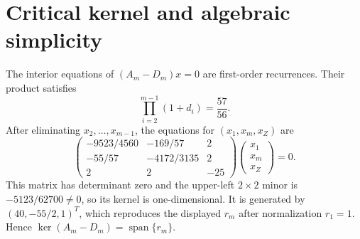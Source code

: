 \section*{Critical kernel and algebraic simplicity}
The interior equations of $(A_m-D_m)x=0$ are first-order recurrences.  Their
product satisfies
\[
\prod_{i=2}^{m-1}(1+d_i)=\frac{57}{56}.
\]
After eliminating $x_2,\ldots,x_{m-1}$, the equations for
$(x_1,x_m,x_Z)$ are
\[
\begin{pmatrix}
-9523/4560&-169/57&2\\
-55/57&-4172/3135&2\\
2&2&-25
\end{pmatrix}
\begin{pmatrix}x_1\\x_m\\x_Z\end{pmatrix}=0.
\]
This matrix has determinant zero and the upper-left $2\times2$ minor is
$-5123/62700\neq0$, so its kernel is one-dimensional.  It is generated by
$(40,-55/2,1)^T$, which reproduces the displayed $r_m$ after normalization
$r_1=1$.  Hence $\ker(A_m-D_m)=\operatorname{span}\{r_m\}$.
